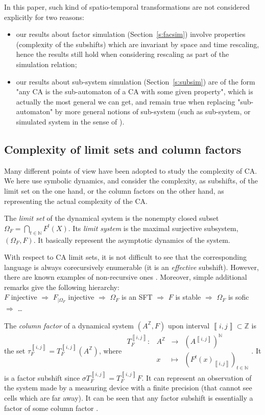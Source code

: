 \documentclass{jac}
\let\dfn\emph
\let\impl\Rightarrow
\newcommand{\Z}{\mathbb Z}
\newcommand{\N}{\mathbb N}
\newcommand{\az}{{A^\Z}}
\newcommand{\oo}[2]{\left\rrbracket #1,#2\right\llbracket}
\newcommand{\cc}[2]{\left\llbracket #1,#2\right\rrbracket}
\newcommand{\scc}[2]{_{\cc{#1}{#2}}}\newcommand{\soo}[2]{_{\oo{#1}{#2}}}\newcommand{\co}[2]{\left\llbracket #1,#2\right\llbracket}\newcommand{\sco}[2]{_{\co{#1}{#2}}}\newcommand{\kaprx}[1]{\mathcal A_{#1}}
\newcommand{\restr}[1]{_{\left|#1\right.}}
\newcommand{\appl}[5]{\begin{array}{rrcl}#1:&#2&\to&#3\\
&#4&\mapsto&\displaystyle#5\end{array}}
\theoremstyle{definition}
\begin{document}
In this paper, such kind of spatio-temporal transformations are not considered explicitly for two reasons:
\begin{itemize}
\item our results about factor simulation (Section~\ref{s:facsim}) involve properties
(complexity of the subshifts) which are invariant by space and time
rescaling, hence the results still hold when considering rescaling as part of the simulation relation;
\item our results about sub-system simulation (Section~\ref{s:subsim}) are of the form
"any CA is the sub-automaton of a CA with some given property", which is
actually the most general we can get, and remain true when replacing
"sub-automaton" by more general notions of sub-system (such as
sub-system, or simulated system in the sense of \cite{bulk2}).
\end{itemize}





\subsection{Complexity of limit sets and column factors}

Many different points of view have been adopted to study the complexity of CA. We here use symbolic dynamics, and consider the complexity, as subshifts, of the limit set on the one hand, or the column factors on the other hand, as representing the actual complexity of the CA.

The \dfn{limit set} of the dynamical system is the nonempty closed subset $\Omega_F=\bigcap_{t\in\N}F^t(X)$. Its \dfn{limit system} is the maximal surjective subsystem, $(\Omega_F,F)$. It basically represent the asymptotic dynamics of the system.

With respect to CA limit sets, it is not difficult to see that the corresponding language is always corecursively enumerable (it is an \emph{effective} subshift). However, there are known examples of non-recursive ones \cite{langlim2}. Moreover, simple additional remarks \cite{revlim,kurka,nasu} give the following hierarchy:\\
$F$ injective $\impl$ $F\restr{\Omega_F}$ injective $\impl$ $\Omega_F$ is an SFT $\impl$ $F$ is stable $\impl$ $\Omega_F$ is sofic $\impl$ \ldots\

The \dfn{column factor} of a dynamical system $(\az,F)$ upon interval $\cc ij\subset\Z$ is the set $\tau_F^{\cc ij}=T_F^{\cc ij}(\az)$, where $\appl{T_F^{\cc ij}}\az{(A^{\cc ij})^\N}x{(F^t(x)\scc ij)_{t\in\N}}$. It is a factor subshift since $\sigma T_F^{\cc ij}=T_F^{\cc ij}F$. It can represent an observation of the system made by a measuring device with a finite precision (that cannot see cells which are far away). It can be seen that any factor subshift is essentially a factor of some column factor \cite{classif}.
\end{document}
